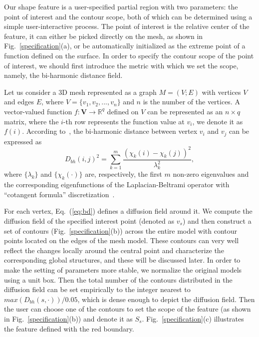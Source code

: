 Our shape feature is a user-specified partial region with two
parameters: the point of interest and the contour scope, both of
which can be determined using a simple user-interactive process. The
point of interest is the relative center of the feature, it can either
be picked directly on the mesh, as shown in
Fig.~\ref{specification}(a), or be automatically initialized as the
extreme point of a function defined on the surface. In order to specify
the contour scope of the point of interest, we should first introduce
the metric with which we set the scope, namely, the bi-harmonic
distance field.

Let us consider a 3D mesh represented as a graph $M = (V;E)$ with
vertices $V$ and edges $E$, where $V = \{v_1,v_2,...,v_n\}$ and $n$ is
the number of the vertices. A vector-valued function $f \colon
\textbf{V} \rightarrow \mathbb{R}^q $ defined on $V$ can be
represented as an $n \times q$ matrix, where the $i$-th row represents
the function value at $v_i$, we denote it as $f(i)$. According
to~\cite{Lipman:2010}, the bi-harmonic distance between vertex $v_i$
and $v_j$ can be expressed as
\begin{equation}
\label{eq:bd}
D_{bh}(i,j)^2=\sum_{k=1}^{m}\frac{(\chi_k(i)-\chi_k(j))^2}{\lambda_k^2},
\end{equation}
where $\{\lambda_k\}$ and $\{\chi_k(\cdot)\}$ are, respectively, the
first $m$ non-zero eigenvalues and the corresponding eigenfunctions of
the Laplacian-Beltrami operator with ``cotangent formula''
discretization~\cite{Meyer2003}.

For each vertex, Eq.~(\ref{eq:bd}) defines a diffusion field around
it. We compute the diffusion field of the specified interest point
(denoted as $v_s$) and then construct a set of contours
(Fig.~\ref{specification}(b)) across the entire model with contour
points located on the edges of the mesh model. These contours can very
well reflect the changes locally around the central point and
characterize the corresponding global structures, and these will be
discussed later. In order to make the setting of parameters more
stable, we normalize the original models using a unit box. Then the
total number of the contours distributed in the diffusion field can be
set empirically to the integer nearest to $max(D_{bh}(s,\cdot))/0.05$,
which is dense enough to depict the diffusion field. Then the user can
choose one of the contours to set the scope of the feature (as shown
in Fig.~\ref{specification}(b)) and denote it as $S_{s}$.
Fig.~\ref{specification}(c) illustrates the feature defined with the
red boundary.


